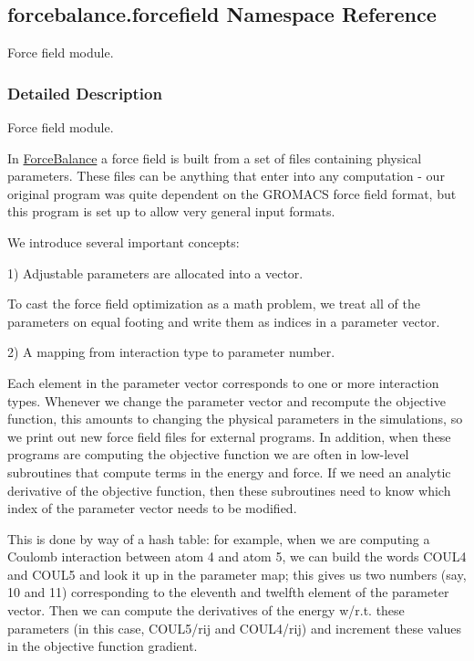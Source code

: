 \hypertarget{namespaceforcebalance_1_1forcefield}{}\subsection{forcebalance.\+forcefield Namespace Reference}
\label{namespaceforcebalance_1_1forcefield}


Force field module.  




\subsubsection{Detailed Description}
Force field module. 

In \hyperlink{namespaceForceBalance}{Force\+Balance} a \textquotesingle{}force field\textquotesingle{} is built from a set of files containing physical parameters. These files can be anything that enter into any computation -\/ our original program was quite dependent on the G\+R\+O\+M\+A\+CS force field format, but this program is set up to allow very general input formats.

We introduce several important concepts\+:

1) Adjustable parameters are allocated into a vector.

To cast the force field optimization as a math problem, we treat all of the parameters on equal footing and write them as indices in a parameter vector.

2) A mapping from interaction type to parameter number.

Each element in the parameter vector corresponds to one or more interaction types. Whenever we change the parameter vector and recompute the objective function, this amounts to changing the physical parameters in the simulations, so we print out new force field files for external programs. In addition, when these programs are computing the objective function we are often in low-\/level subroutines that compute terms in the energy and force. If we need an analytic derivative of the objective function, then these subroutines need to know which index of the parameter vector needs to be modified.

This is done by way of a hash table\+: for example, when we are computing a Coulomb interaction between atom 4 and atom 5, we can build the words \textquotesingle{}C\+O\+U\+L4\textquotesingle{} and \textquotesingle{}C\+O\+U\+L5\textquotesingle{} and look it up in the parameter map; this gives us two numbers (say, 10 and 11) corresponding to the eleventh and twelfth element of the parameter vector. Then we can compute the derivatives of the energy w/r.\+t. these parameters (in this case, C\+O\+U\+L5/rij and C\+O\+U\+L4/rij) and increment these values in the objective function gradient.

